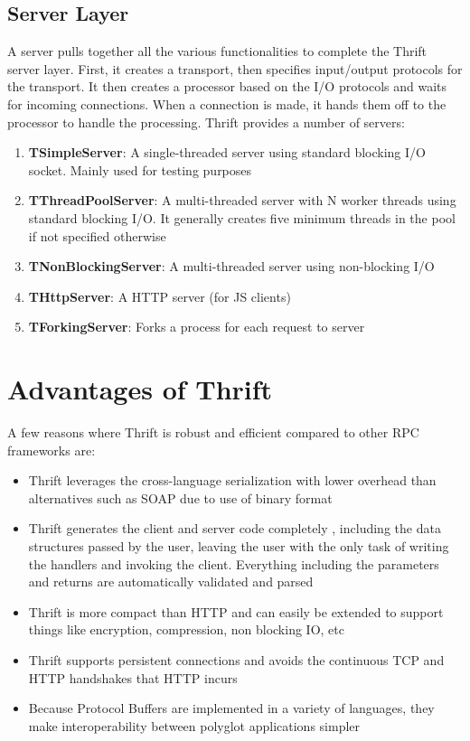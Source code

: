 \documentclass[9pt,twocolumn,twoside]{../../styles/osajnl}
\begin{document}
	
\subsection{Server Layer}	
A server pulls together all the various functionalities to complete the Thrift server layer. First, it creates a transport, then specifies input/output protocols for the transport. It then creates a processor based on the I/O protocols and waits for incoming connections. When a connection is made, it hands them off to the processor to handle the processing. Thrift provides a number of servers:
\begin{enumerate}
	\item \textbf{TSimpleServer}: A single-threaded server using standard blocking I/O socket. Mainly used for testing purposes
	\item \textbf{TThreadPoolServer}: A multi-threaded server with N worker threads using standard blocking I/O. It generally creates five minimum threads in the pool if not specified otherwise
	\item \textbf{TNonBlockingServer}: A multi-threaded server using non-blocking I/O
	\item \textbf{THttpServer}: A HTTP server (for JS clients)
	\item \textbf{TForkingServer}: Forks a process for each request to server\\
\end{enumerate}



\section{Advantages of Thrift}
A few reasons where Thrift is robust and efficient compared to other RPC frameworks are:
\begin{itemize}
\item Thrift leverages the cross-language serialization with lower overhead than alternatives such as SOAP due to use of binary format
\item Thrift generates the client and server code completely \cite{www-thrift-tutorial}, including the data structures passed by the user, leaving the user with the only task of writing the handlers and invoking the client. Everything including the parameters and returns are automatically validated and parsed
\item Thrift is more compact than HTTP and can easily be extended to support things like encryption, compression, non blocking IO, etc
\item Thrift supports persistent connections and avoids the continuous TCP and HTTP handshakes that HTTP incurs
\item Because Protocol Buffers \cite{www-protocol-buffers} are implemented in a variety of languages, they make interoperability between polyglot applications simpler\\
\end{itemize}
\end{document}
